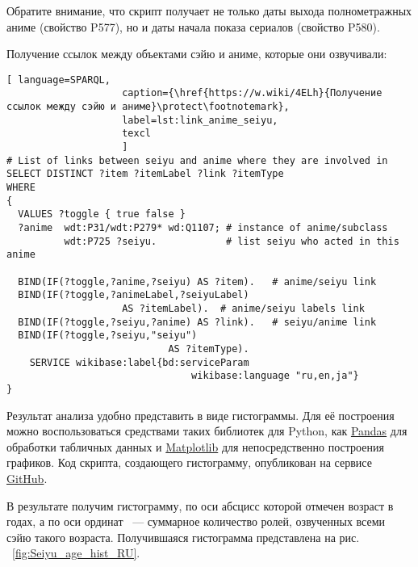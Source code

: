 Обратите внимание, что скрипт получает не только даты выхода полнометражных аниме (свойство P577), но и даты начала показа сериалов (свойство P580). 

Получение ссылок между объектами сэйю и аниме, которые они озвучивали: 

\begin{lstlisting}[ language=SPARQL, 
                    caption={\href{https://w.wiki/4ELh}{Получение ссылок между сэйю и аниме}\protect\footnotemark},
                    label=lst:link_anime_seiyu,
                    texcl 
                    ]
# List of links between seiyu and anime where they are involved in
SELECT DISTINCT ?item ?itemLabel ?link ?itemType
WHERE
{
  VALUES ?toggle { true false }
  ?anime  wdt:P31/wdt:P279* wd:Q1107; # instance of anime/subclass
          wdt:P725 ?seiyu.            # list seiyu who acted in this anime
  
  BIND(IF(?toggle,?anime,?seiyu) AS ?item).   # anime/seiyu link
  BIND(IF(?toggle,?animeLabel,?seiyuLabel)
					AS ?itemLabel).  # anime/seiyu labels link
  BIND(IF(?toggle,?seiyu,?anime) AS ?link).   # seiyu/anime link
  BIND(IF(?toggle,?seiyu,"seiyu")
							AS ?itemType).
    SERVICE wikibase:label{bd:serviceParam
					     		wikibase:language "ru,en,ja"}
}
\end{lstlisting}%

Результат анализа удобно представить в виде гистограммы. Для её построения можно воспользоваться средствами таких библиотек для Python, как \href{https://ru.wikipedia.org/wiki/Pandas}{Pandas} для обработки табличных данных и \href{https://ru.wikipedia.org/wiki/Matplotlib}{Matplotlib} для непосредственно построения графиков. Код скрипта, создающего гистограмму, опубликован на сервисе \href{https://github.com/componavt/wd_book/blob/master/programming_tasks/seiyu_age/age_act_hist.ipynb}{GitHub}.

В результате получим гистограмму, по оси абсцисс которой отмечен возраст в годах, а по оси ординат ~--- суммарное количество ролей, озвученных всеми сэйю такого возраста. Получившаяся гистограмма представлена на рис. ~\ref{fig:Seiyu_age_hist_RU}. 

\begin{figure*}[h]

    \setlength{\fboxsep}{0pt}%
    \setlength{\fboxrule}{1pt}%
	\caption[Гистограмма, которая отображает число аниме, озвученное сэйю разных возрастов, 2021.]{Гистограмма, которая показывает число аниме, озвученных различными сэйю, 2021. Гистограмма построена на основе данных, полученных с помощью запроса ~\protect\ref{lst:link_anime_seiyu}.}%
    \label{fig:Seiyu_age_hist_RU}%
\end{figure*} 

